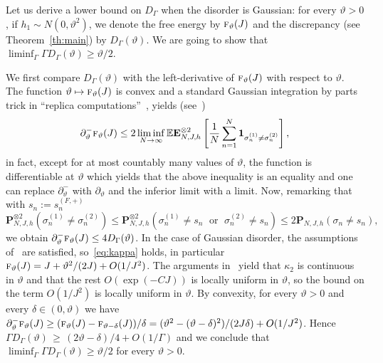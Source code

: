 \documentclass[AHL,Unicode,longabstracts,published]{cedram}
\newcommand{\ind}{\mathbf{1}}
\newcommand{\bP}{\mathbf{P}}
\newcommand{\bE}{\mathbf{E}}
\newcommand{\bbE}{\mathbb{E}}
\newcommand{\gd}{\delta}
\newcommand{\gG}{\Gamma}
\newcommand{\gs}{\sigma}
\newcommand{\tf}{\textsc{f}}
\renewcommand*{\to}{\mathchoice{\longrightarrow}{\rightarrow}{\rightarrow}{\rightarrow}}
\let\oldmapsto\mapsto
\renewcommand*{\mapsto}{\mathchoice{\longmapsto}{\oldmapsto}{\oldmapsto}{\oldmapsto}}
\begin{document}
\begin{rema}\label{rem:overlap}
Let us derive a lower bound on $D_\gG$ when the disorder is Gaussian: for every $\vartheta>0$, if $h_1 \sim N(0, \vartheta^2)$, we denote the free energy by $\tf_\vartheta (J)$ and the discrepancy (see Theorem~\ref{th:main}) by $D_\gG(\vartheta)$. We are going to show that $\liminf_\gG \gG D_\gG(\vartheta)\ge \vartheta/2$.

We first compare $D_\gG(\vartheta)$ with the left-derivative of $\tf_\vartheta (J)$ with respect to $\vartheta$. The function $\vartheta \mapsto \tf_\vartheta (J)$ is convex and a standard Gaussian integration by parts trick in ``replica computations''~\cite{cf:Bov}, yields (see~\cite[(C.15)]{cf:CGH1})
\begin{equation}
\partial^-_\vartheta \tf_\vartheta (J) \le 2\liminf_{N \to \infty} \bbE \bE^{\otimes 2}_{N, J, h}\left[\frac1{N} \sum_{n=1}^N
\ind_{ \gs^{(1)}_n\neq \gs^{(2)}_n} \right],
\end{equation}
in fact, except for at most countably many values of $\vartheta$, the function is differentiable at $\vartheta$ which yields that the above inequality is an equality and one can replace $\partial^-_\vartheta$ with $\partial_\vartheta$ and the inferior limit with a limit. Now, remarking that with $s_n:= s^{(F, +)}_n$
\begin{equation}
\bP_{N, J, h}^{\otimes 2}\left(\sigma_n^{(1)}\neq \sigma_n^{(2)}\right)
\le \bP_{N, J, h}^{\otimes 2}\left(\sigma_n^{(1)}\neq s_n \;\text{ or }\; \sigma_n^{(2)}\neq s_n\right)
\le 2 \bP_{N, J, h}\left(\sigma_n\neq s_n\right),
\end{equation}
we obtain $\partial^-_\vartheta \tf_\vartheta (J) \le 4 D_\gG(\vartheta)$. In the case of Gaussian disorder, the assumptions of~\cite{cf:Orphee,cf:GG22} are satisfied, so~\eqref{eq:kappa} holds, in particular $\tf_\vartheta (J)= J+ \vartheta^2/(2J)+ O(1/J^2)$. {The arguments in~\cite{cf:GG22} yield that $\kappa_2$ is continuous in $\vartheta$ and that the rest $O(\exp(-CJ))$ is locally uniform in $\vartheta$, so the bound on the term $O(1/J^2)$ is locally uniform in $\vartheta$}. By convexity, for every $\vartheta>0$ and every $\gd \in (0, \vartheta)$ we have $\partial_{\vartheta}^- \tf_{\vartheta} (J) \ge (\tf_\vartheta (J)- \tf_{\vartheta-\gd} (J))/ \gd = (\vartheta^2- (\vartheta- \gd)^2)/ (2J\gd) + O(1/J^2)$. Hence $\gG D_\gG(\vartheta) \,\ge \, (2\vartheta - \gd)/4+ O(1/ \gG)$ and we conclude that $\liminf_\gG \gG D_\gG(\vartheta)\ge \vartheta/2$ for every $\vartheta>0$.
\end{rema}
\end{document}
